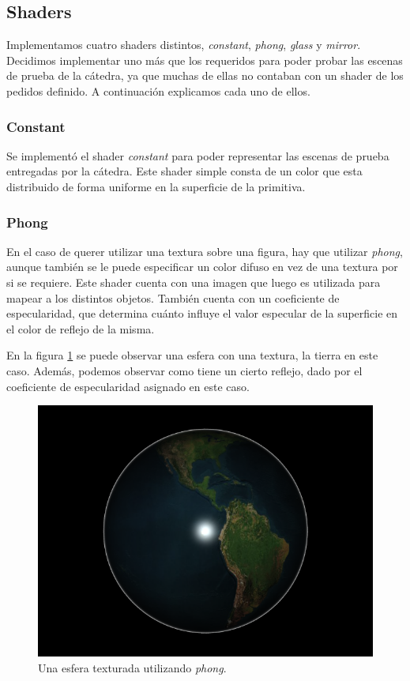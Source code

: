 \documentclass[a4paper,10pt]{article}
\begin{document}
\subsection{Shaders}

Implementamos cuatro shaders distintos, \emph{constant}, \emph{phong},
\emph{glass} y \emph{mirror}.  Decidimos implementar uno m\'as que los
requeridos para poder probar las escenas de prueba de la c\'atedra, ya que
muchas de ellas no contaban con un shader de los pedidos definido.  A
continuaci\'on explicamos cada uno de ellos.

\subsubsection{Constant}
Se implement\'o el shader \emph{constant} para poder representar las escenas de
prueba entregadas por la c\'atedra. Este shader simple consta de un color que
esta distribuido de forma uniforme en la superficie de la primitiva.

\subsubsection{Phong}
En el caso de querer utilizar una textura sobre una figura, hay que utilizar
\emph{phong}, aunque tambi\'en se le puede especificar un color difuso en 
vez de una textura por si se requiere. Este shader cuenta con una imagen
que luego es utilizada para mapear a los distintos objetos.
Tambi\'en cuenta con un coeficiente de especularidad, que determina cu\'anto
influye el valor especular de la superficie en el color de reflejo de la misma.

En la figura \ref{fig:figure11} se puede observar una esfera con una textura,
la tierra en este caso.  Adem\'as, podemos observar como tiene un cierto
reflejo, dado por el coeficiente de especularidad asignado en este caso.

\begin{figure}[ht]
\centering
\includegraphics[scale=0.50]{earth.png}
\caption{Una esfera texturada utilizando \emph{phong}.}
\label{fig:figure11}
\end{figure}
\end{document}
